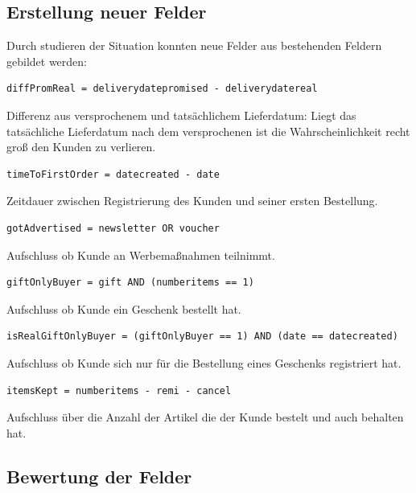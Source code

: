 \documentclass[a4paper,12pt]{article}
\begin{document}
\subsection{Erstellung neuer Felder}
Durch studieren der Situation konnten neue Felder aus bestehenden Feldern gebildet werden:  
\begin{framed}
\begin{verbatim}
diffPromReal = deliverydatepromised - deliverydatereal
\end{verbatim}
\end{framed}
Differenz aus versprochenem und tatsächlichem Lieferdatum: Liegt das tatsächliche Lieferdatum nach dem versprochenen ist die Wahrscheinlichkeit recht groß den Kunden zu verlieren. 
\begin{framed}
\begin{verbatim}
timeToFirstOrder = datecreated - date
\end{verbatim}
\end{framed}
Zeitdauer zwischen Registrierung des Kunden und seiner ersten Bestellung.
\begin{framed}
\begin{verbatim}
gotAdvertised = newsletter OR voucher
\end{verbatim}
\end{framed}
Aufschluss ob Kunde an Werbemaßnahmen teilnimmt.
\begin{framed}
\begin{verbatim}
giftOnlyBuyer = gift AND (numberitems == 1) 
\end{verbatim}
\end{framed}
Aufschluss ob Kunde ein Geschenk bestellt hat.
\begin{framed}
\begin{verbatim}
isRealGiftOnlyBuyer = (giftOnlyBuyer == 1) AND (date == datecreated)
\end{verbatim}
\end{framed}
Aufschluss ob Kunde sich nur für die Bestellung eines Geschenks registriert hat.
\begin{framed}
\begin{verbatim}
itemsKept = numberitems - remi - cancel 
\end{verbatim}
\end{framed}
Aufschluss  über die Anzahl der Artikel die der Kunde bestelt und auch behalten hat.
\subsection{Bewertung der Felder}
\end{document}
